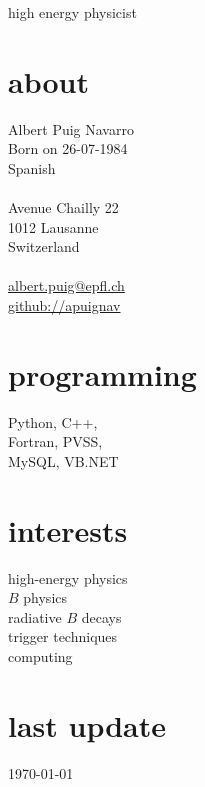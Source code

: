 
\usepackage{xspace}
\def\epfl{\'{E}cole Polytechnique F\'{e}d\'{e}rale de Lausanne\xspace}
\def\myast{\text{\,*}}


       {high energy physicist}

\begin{aside}
  \section{about}
    Albert Puig Navarro\\
    Born on 26-07-1984\\
    Spanish\\
    ~\\
    Avenue Chailly 22\\
    1012 Lausanne\\
    Switzerland\\
    ~\\
    \href{mailto:albert.puig@epfl.ch}{albert.puig@epfl.ch}\\
    \href{https://github.com/apuignav}{github://apuignav}\\
{  \section{programming}
    Python, C++,\\
    Fortran, PVSS,\\
    MySQL, VB.NET\\
}{}
    \section{interests}
    high-energy physics\\
    $B$ physics\\
    radiative $B$ decays\\
    trigger techniques\\
    computing\\

    \section{last update}
    \today

\end{aside}

